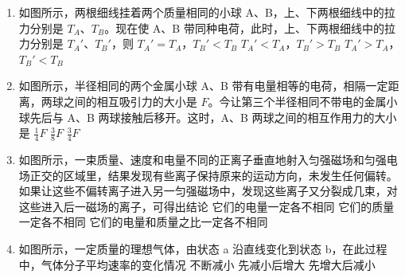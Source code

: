 \documentclass[\gkver]{gaokaozhenti}
\begin{document}
\begin{enumerate}
\item
如图所示，两根细线挂着两个质量相同的小球 A、B，上、下两根细线中的拉力分别是 $T_{A}$、$T_{B}$。现在使 A、B 带同种电荷，此时，上、下两根细线中的拉力分别是 $T_{A}'$、$T_{B}'$，则
\onepicture{}
{$T_{A}' = T_{A}$，$T_{B}' < T_{B}$}
{$T_{A}' < T_{A}$，$T_{B}' > T_{B}$}
{$T_{A}' > T_{A}$，$T_{B}' < T_{B}$}

\item
如图所示，半径相同的两个金属小球 A、B 带有电量相等的电荷，相隔一定距离，两球之间的相互吸引力的大小是 $F$。今让第三个半径相同不带电的金属小球先后与 A、B 两球接触后移开。这时，A、B 两球之间的相互作用力的大小是
\onepicture{}
{$\frac{1}{4}F$}
{$\frac{3}{8}F$}
{$\frac{3}{4}F$}

\item
如图所示，一束质量、速度和电量不同的正离子垂直地射入匀强磁场和匀强电场正交的区域里，结果发现有些离子保持原来的运动方向，未发生任何偏转。如果让这些不偏转离子进入另一匀强磁场中，发现这些离子又分裂成几束，对这些进入后一磁场的离子，可得出结论
\onepicture{}
{它们的电量一定各不相同}
{它们的质量一定各不相同}
{它们的电量和质量之比一定各不相同}

\item
如图所示，一定质量的理想气体，由状态 a 沿直线变化到状态 b，在此过程中，气体分子平均速率的变化情况
\onepicture{}
{不断减小}
{先减小后增大}
{先增大后减小}


\end{enumerate}
\end{document}
